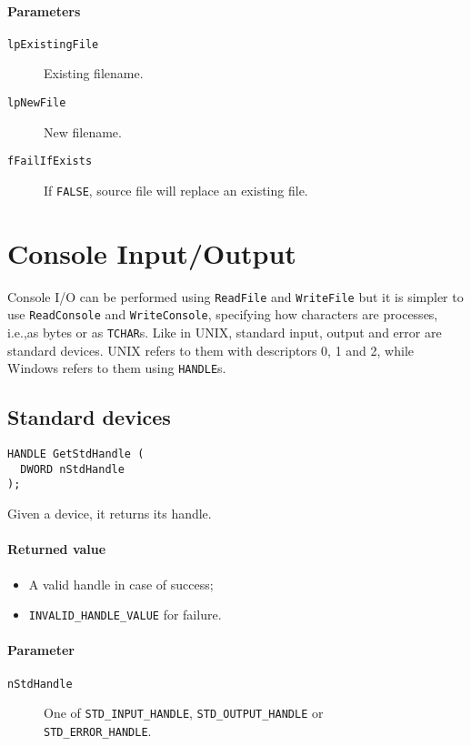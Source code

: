 \paragraph{Parameters}
\begin{description}
\item [\texttt{lpExistingFile}] Existing filename.
\item [\texttt{lpNewFile}] New filename.
\item [\texttt{fFailIfExists}] If \texttt{FALSE}, source file will replace an existing file.
\end{description}

\section{Console Input/Output}
Console I/O can be performed using \texttt{ReadFile} and \texttt{WriteFile} but it is simpler to use \texttt{ReadConsole} and \texttt{WriteConsole}, specifying how characters are processes, i.e.,\@ as bytes or as \texttt{TCHAR}s. Like in UNIX, standard input, output and error are standard devices. UNIX refers to them with descriptors 0, 1 and 2, while Windows refers to them using \texttt{HANDLE}s.

\subsection{Standard devices}
\begin{verbatim}
HANDLE GetStdHandle (
  DWORD nStdHandle
);
\end{verbatim}

Given a device, it returns its handle.

\paragraph{Returned value}
\begin{itemize}
\item A valid handle in case of success;
\item \texttt{INVALID\_HANDLE\_VALUE} for failure.
\end{itemize}

\paragraph{Parameter}
\begin{description}
\item [\texttt{nStdHandle}] One of \texttt{STD\_INPUT\_HANDLE}, \texttt{STD\_OUTPUT\_HANDLE} or \\ \texttt{STD\_ERROR\_HANDLE}.
\end{description}

